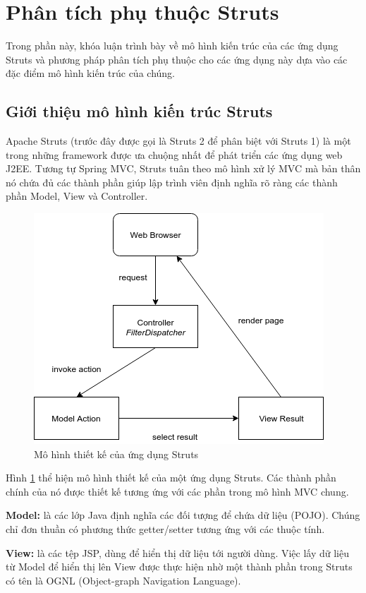 \documentclass[12pt]{report}
\begin{document}
\section{Phân tích phụ thuộc Struts}
Trong phần này, khóa luận trình bày về mô hình kiến trúc của các ứng dụng Struts và phương pháp phân tích phụ thuộc cho các ứng dụng này dựa vào các đặc điểm mô hình kiến trúc của chúng.
\subsection{Giới thiệu mô hình kiến trúc Struts}
Apache Struts (trước đây được gọi là Struts 2 để phân biệt với Struts 1) là một trong những framework được ưa chuộng nhất để phát triển các ứng dụng web J2EE. Tương tự Spring MVC, Struts tuân theo mô hình xử lý MVC mà bản thân nó chứa đủ các thành phần giúp lập trình viên định nghĩa rõ ràng các thành phần Model, View và Controller.

\begin{figure}[h]
	\centering
	\includegraphics[scale=0.8]{struts-architecture}
	\caption{Mô hình thiết kế của ứng dụng Struts}
	\label{fig:struts-architecture}
\end{figure}

Hình \ref{fig:struts-architecture} thể hiện mô hình thiết kế của một ứng dụng Struts. Các thành phần chính của nó được thiết kế tương ứng với các phần trong mô hình MVC chung.

\textbf{Model:} là các lớp Java định nghĩa các đối tượng để chứa dữ liệu (POJO). Chúng chỉ đơn thuần có phương thức getter/setter tương ứng với các thuộc tính.

\textbf{View:} là các tệp JSP, dùng để hiển thị dữ liệu tới người dùng. Việc lấy dữ liệu từ Model để hiển thị lên View được thực hiện nhờ một thành phần trong Struts có tên là OGNL (Object-graph Navigation Language).
\end{document}
